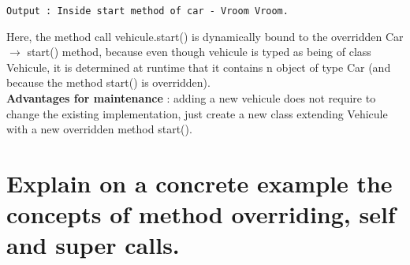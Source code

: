 \begin{itemize}
\begin{lstlisting}[caption=Pseudocode example of dynamic binding]
Output : Inside start method of car - Vroom Vroom.
\end{lstlisting}
Here, the method call vehicule.start() is dynamically bound to the overridden Car $\rightarrow$ start() method, because even though vehicule is typed as being of class Vehicule, it is determined at runtime that it contains n object of type Car (and because the method start() is overridden).\\
\textbf{Advantages for maintenance} : adding a new vehicule does not require to change the existing implementation, just create a new class extending Vehicule with a new overridden method start().
\end{itemize}

\section{Explain on a concrete example the concepts of method overriding, self and super calls.}

